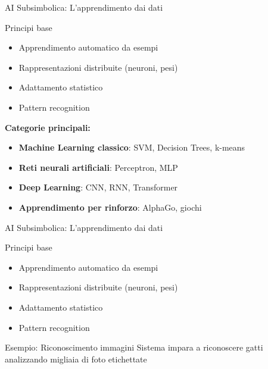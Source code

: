 \documentclass[aspectratio=169,12pt]{beamer}
\begin{document}
\begin{frame}{AI Subsimbolica: L'apprendimento dai dati}
    \begin{block}{Principi base}
        \begin{itemize}
            \item Apprendimento automatico da esempi
            \item Rappresentazioni distribuite (neuroni, pesi)
            \item Adattamento statistico
            \item Pattern recognition
        \end{itemize}
    \end{block}
    
    \textbf{Categorie principali:}
    \begin{itemize}
        \item \textbf{Machine Learning classico}: SVM, Decision Trees, k-means
        \item \textbf{Reti neurali artificiali}: Perceptron, MLP
        \item \textbf{Deep Learning}: CNN, RNN, Transformer
        \item \textbf{Apprendimento per rinforzo}: AlphaGo, giochi
    \end{itemize}
\end{frame}
%
%
\begin{frame}{AI Subsimbolica: L'apprendimento dai dati}
    \begin{block}{Principi base}
        \begin{itemize}
            \item Apprendimento automatico da esempi
            \item Rappresentazioni distribuite (neuroni, pesi)
            \item Adattamento statistico
            \item Pattern recognition
        \end{itemize}
    \end{block}
    
    \vspace{0.3cm}
    
    \begin{exampleblock}{Esempio: Riconoscimento immagini}
        Sistema impara a riconoscere gatti analizzando migliaia di foto etichettate
    \end{exampleblock}
\end{frame}
\end{document}
